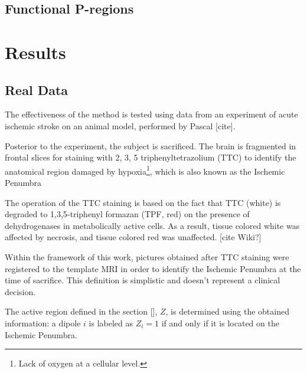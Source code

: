 \subsection{Functional P-regions}



\section{Results}

\subsection{Real Data}

The effectiveness of the method is tested using data from an experiment 
of acute ischemic stroke on an animal model, performed by
Pascal [cite].

Posterior to the experiment, the subject is sacrificed.
%
The brain is fragmented in frontal slices for staining with
2, 3, 5 
triphenyltetrazolium (TTC)
to identify the anatomical region damaged by hypoxia\footnote{Lack of oxygen at a cellular level.}, which is also known as the Ischemic Penumbra

The operation of the TTC staining is based on the fact that TTC (white) 
is degraded to 1,3,5-triphenyl formazan (TPF, red)
on the presence of dehydrogenases in metabolically active cells.
%
As a result, tissue colored white was affected by necrosis, and tissue colored red was unaffected. 
[cite Wiki?]


Within the framework of this work, pictures obtained after TTC staining were registered to the template MRI in order to identify the Ischemic Penumbra at the time of sacrifice.
%
This definition is simplistic and doesn't represent a clinical decision.

The active region defined in the section [], $Z$, is determined using the obtained information: a dipole $i$ is labeled as $Z_i=1$ if and only if it is located on the Ischemic Penumbra.





 



 




 


